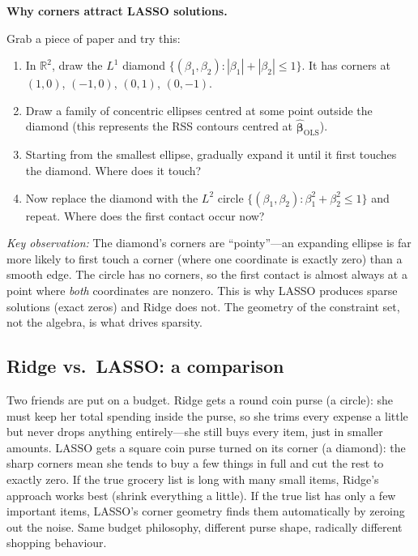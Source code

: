 \documentclass[11pt,a4paper]{article}
\theoremstyle{plain}
\theoremstyle{definition}
\newcommand{\R}{\mathbb{R}}
\newcommand{\bhat}{\hat{\bm{\beta}}}
\begin{document}
\begin{stopandthink}
\textbf{Why corners attract LASSO solutions.}

Grab a piece of paper and try this:
\begin{enumerate}[nosep]
  \item In $\R^2$, draw the $L^1$ diamond
        $\{(\beta_1, \beta_2) : |\beta_1| + |\beta_2| \le 1\}$.
        It has corners at $(1,0)$, $(-1,0)$, $(0,1)$, $(0,-1)$.
  \item Draw a family of concentric ellipses centred at some point
        outside the diamond (this represents the RSS contours centred
        at $\bhat_{\text{OLS}}$).
  \item Starting from the smallest ellipse, gradually expand it until
        it first touches the diamond. Where does it touch?
  \item Now replace the diamond with the $L^2$ circle
        $\{(\beta_1, \beta_2) : \beta_1^2 + \beta_2^2 \le 1\}$
        and repeat. Where does the first contact occur now?
\end{enumerate}
\emph{Key observation:}
The diamond's corners are ``pointy''---an expanding ellipse is far more
likely to first touch a corner (where one coordinate is exactly zero)
than a smooth edge.
The circle has no corners, so the first contact is almost always at a
point where \emph{both} coordinates are nonzero.
This is why LASSO produces sparse solutions (exact zeros) and Ridge
does not.
The geometry of the constraint set, not the algebra, is what drives
sparsity.
\end{stopandthink}


\subsection{Ridge vs.\ LASSO: a comparison}

\begin{toystory}
Two friends are put on a budget.  Ridge gets a round coin purse (a
circle): she must keep her total spending inside the purse, so she trims
every expense a little but never drops anything entirely---she still
buys every item, just in smaller amounts.  LASSO gets a square coin
purse turned on its corner (a diamond): the sharp corners mean she tends
to buy a few things in full and cut the rest to exactly zero.  If the
true grocery list is long with many small items, Ridge's approach works
best (shrink everything a little).  If the true list has only a few
important items, LASSO's corner geometry finds them automatically by
zeroing out the noise.  Same budget philosophy, different purse shape,
radically different shopping behaviour.
\end{toystory}
\end{document}
